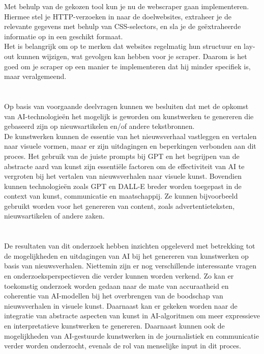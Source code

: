 Met behulp van de gekozen tool kun je nu de webscraper gaan implementeren. Hiermee stel je HTTP-verzoeken in naar de doelwebsites, extraheer je de relevante gegevens met behulp van CSS-selectors, en sla je de geëxtraheerde informatie op in een geschikt formaat.  \\

Het is belangrijk om op te merken dat websites regelmatig hun structuur en lay-out kunnen wijzigen, wat gevolgen kan hebben voor je scraper. Daarom is het goed om je scraper op een manier te implementeren dat hij minder specifiek is, maar veralgemeend.

\section{  }%
Op basis van voorgaande deelvragen kunnen we besluiten dat met de opkomst van AI-technologieën  het mogelijk is geworden om kunstwerken te genereren die gebaseerd zijn op nieuwsartikelen en/of andere tekstbronnen. \\

De kunstwerken kunnen de essentie van het nieuwsverhaal vastleggen en vertalen naar visuele vormen, maar er zijn uitdagingen en beperkingen verbonden aan dit proces. Het gebruik van de juiste prompts bij GPT en het begrijpen van de abstracte aard van kunst zijn essentiële factoren om de effectiviteit van AI te vergroten bij het vertalen van nieuwsverhalen naar visuele kunst. Bovendien kunnen technologieën zoals GPT en DALL-E breder worden toegepast in de context van kunst, communicatie en maatschappij. Ze kunnen bijvoorbeeld gebruikt worden voor het genereren van content, zoals advertentieteksten, nieuwsartikelen of andere zaken.


\section{  }%
De resultaten van dit onderzoek hebben inzichten opgeleverd met betrekking tot de mogelijkheden en uitdagingen van AI bij het genereren van kunstwerken op basis van nieuwsverhalen. Niettemin zijn er nog verschillende interessante vragen en onderzoeksperspectieven die verder kunnen worden verkend. Zo kan er toekomstig onderzoek worden gedaan naar de mate van accuraatheid en coherentie van AI-modellen bij het overbrengen van de boodschap van nieuwsverhalen in visuele kunst. Daarnaast kan er gekeken worden naar de integratie van abstracte aspecten van kunst in AI-algoritmen om meer expressieve en interpretatieve kunstwerken te genereren.  Daarnaast kunnen ook de mogelijkheden van AI-gestuurde kunstwerken in de journalistiek en communicatie verder worden onderzocht, evenals de rol van menselijke input in dit proces.

